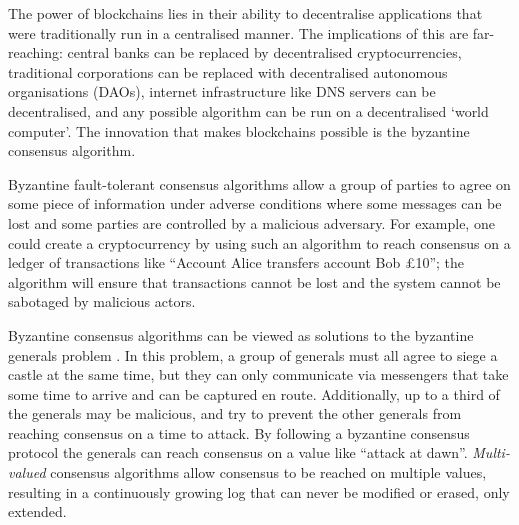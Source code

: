 
The power of blockchains lies in their ability to decentralise applications that were traditionally run in a centralised manner. The implications of this are far-reaching: central banks can be replaced by decentralised cryptocurrencies, traditional corporations can be replaced with decentralised autonomous organisations (DAOs), internet infrastructure like DNS servers can be decentralised, and any possible algorithm can be run on a decentralised `world computer'. The innovation that makes blockchains possible is the byzantine consensus algorithm.

Byzantine fault-tolerant consensus algorithms allow a group of parties to agree on some piece of information under adverse conditions where some messages can be lost and some parties are controlled by a malicious adversary. For example, one could create a cryptocurrency by using such an algorithm to reach consensus on a ledger of transactions like ``Account Alice transfers account Bob £10''; the algorithm will ensure that transactions cannot be lost and the system cannot be sabotaged by malicious actors.

Byzantine consensus algorithms can be viewed as solutions to the byzantine generals problem \cite{lamport_byzantine_nodate}. In this problem, a group of generals must all agree to siege a castle at the same time, but they can only communicate via messengers that take some time to arrive and can be captured en route. Additionally, up to a third of the generals may be malicious, and try to prevent the other generals from reaching consensus on a time to attack. By following a byzantine consensus protocol the generals can reach consensus on a value like ``attack at dawn''. \textit{Multi-valued} consensus algorithms allow consensus to be reached on multiple values, resulting in a continuously growing log that can never be modified or erased, only extended.

